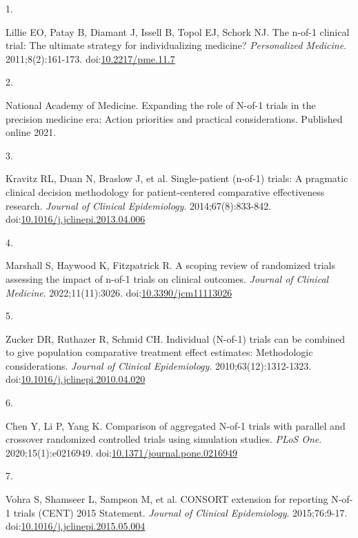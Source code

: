 \documentclass[
  11pt,
]{article}
\newlength{\cslhangindent}
\newlength{\csllabelwidth}
\newenvironment{CSLReferences}[2] %
 {\begin{list}{}{%
  \setlength{\itemindent}{0pt}
  \setlength{\leftmargin}{0pt}
  \setlength{\parsep}{0pt}
  \ifodd #1
   \setlength{\leftmargin}{\cslhangindent}
   \setlength{\itemindent}{-1\cslhangindent}
  \fi
  \setlength{\itemsep}{#2\baselineskip}}}
 {\end{list}}
\newcommand{\CSLLeftMargin}[1]{\parbox[t]{\csllabelwidth}{\strut#1\strut}}
\newcommand{\CSLRightInline}[1]{\parbox[t]{\linewidth - \csllabelwidth}{\strut#1\strut}}
\begin{document}
\protect{}\label{refs}
\begin{CSLReferences}{0}{1}
\CSLLeftMargin{1. }%
\CSLRightInline{Lillie EO, Patay B, Diamant J, Issell B, Topol EJ,
Schork NJ. The n-of-1 clinical trial: The ultimate strategy for
individualizing medicine? \emph{Personalized Medicine}.
2011;8(2):161-173.
doi:\href{https://doi.org/10.2217/pme.11.7}{10.2217/pme.11.7}}

\CSLLeftMargin{2. }%
\CSLRightInline{National Academy of Medicine. Expanding the role of
{N-of-1} trials in the precision medicine era: {Action} priorities and
practical considerations. Published online 2021.}

\CSLLeftMargin{3. }%
\CSLRightInline{{Kravitz RL, Duan N, Braslow J, et al.} Single-patient
(n-of-1) trials: A pragmatic clinical decision methodology for
patient-centered comparative effectiveness research. \emph{Journal of
Clinical Epidemiology}. 2014;67(8):833-842.
doi:\href{https://doi.org/10.1016/j.jclinepi.2013.04.006}{10.1016/j.jclinepi.2013.04.006}}

\CSLLeftMargin{4. }%
\CSLRightInline{Marshall S, Haywood K, Fitzpatrick R. A scoping review
of randomized trials assessing the impact of n-of-1 trials on clinical
outcomes. \emph{Journal of Clinical Medicine}. 2022;11(11):3026.
doi:\href{https://doi.org/10.3390/jcm11113026}{10.3390/jcm11113026}}

\CSLLeftMargin{5. }%
\CSLRightInline{Zucker DR, Ruthazer R, Schmid CH. Individual ({N-of-1})
trials can be combined to give population comparative treatment effect
estimates: Methodologic considerations. \emph{Journal of Clinical
Epidemiology}. 2010;63(12):1312-1323.
doi:\href{https://doi.org/10.1016/j.jclinepi.2010.04.020}{10.1016/j.jclinepi.2010.04.020}}

\CSLLeftMargin{6. }%
\CSLRightInline{Chen Y, Li P, Yang K. Comparison of aggregated {N-of-1}
trials with parallel and crossover randomized controlled trials using
simulation studies. \emph{PLoS One}. 2020;15(1):e0216949.
doi:\href{https://doi.org/10.1371/journal.pone.0216949}{10.1371/journal.pone.0216949}}

\CSLLeftMargin{7. }%
\CSLRightInline{{Vohra S, Shamseer L, Sampson M, et al.} {CONSORT}
extension for reporting {N-of-1} trials ({CENT}) 2015 {Statement}.
\emph{Journal of Clinical Epidemiology}. 2015;76:9-17.
doi:\href{https://doi.org/10.1016/j.jclinepi.2015.05.004}{10.1016/j.jclinepi.2015.05.004}}


\end{CSLReferences}
\end{document}
